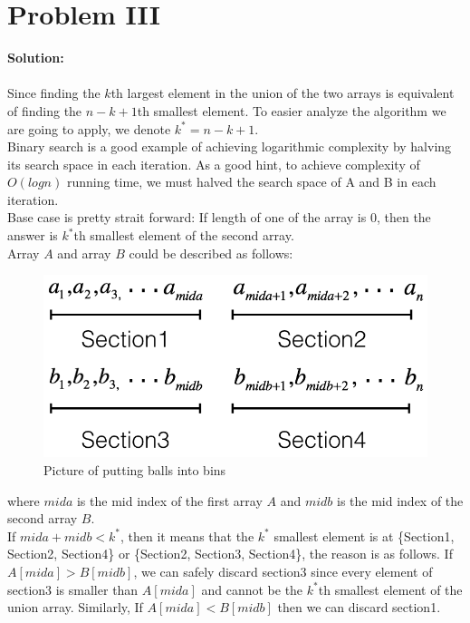 \section{Problem III}

\textbf{Solution:} \\\\
Since finding the $k$th largest element in the union of the two arrays is equivalent of finding the $n - k + 1$th smallest element. To easier analyze the algorithm we are going to apply, we denote $k^* = n - k + 1$.\\

Binary search is a good example of achieving logarithmic complexity by halving its search space in each iteration. As a good hint, to achieve complexity of $O(logn)$ running time, we must halved the search space of A and B in each iteration.\\

Base case is pretty strait forward: If length of one of the array is 0, then the answer is $k^*$th smallest element of the second array.\\

Array $A$ and array $B$ could be described as follows:

\begin{figure}[h]
\centering
\includegraphics[scale=0.4]{hw2p3}
\caption{Picture of putting balls into bins}
\label{fig:p3}
\end{figure}

where $mida$ is the mid index of the first array $A$ and $midb$ is the mid index of the second array $B$. \\

If $mida + midb < k^{*}$, then it means that the $k^*$ smallest element is at \{Section1, Section2, Section4\} or \{Section2, Section3, Section4\}, the reason is as follows. If $A[mida] > B[midb]$, we can safely discard section3 since every element of section3 is smaller than $A[mida]$ and cannot be the $k^{*}$th smallest element of the union array. Similarly, If $A[mida] < B[midb]$ then we can discard section1.\\

